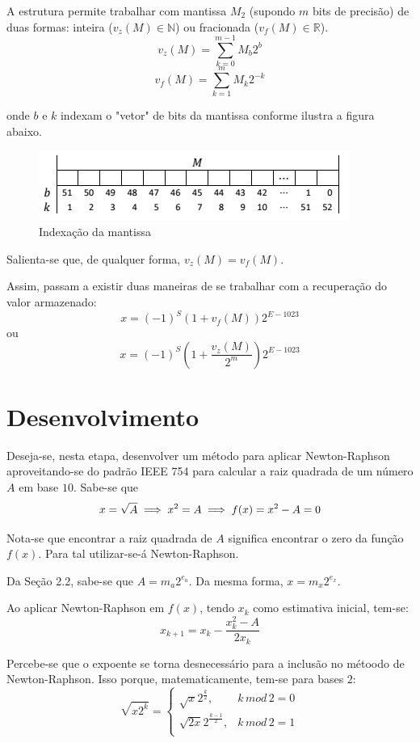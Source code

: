 	A estrutura permite trabalhar com mantissa $M_2$ (supondo $m$ bits de precisão) de duas formas: inteira ($v_z(M) \in \mathbb{N}$) ou fracionada ($v_f(M) \in \mathbb{R}$).
	$$v_z(M) = \sum_{k=0}^{m-1}{M_b2^{b}}$$
	$$v_f(M) = \sum_{k=1}^{m}{M_k2^{-k}}$$

	onde $b$ e $k$ indexam o "vetor" de bits da mantissa conforme ilustra a figura abaixo.
	\begin{figure}[h]
		\centering
		\includegraphics{index_mant}
		\caption{Indexação da mantissa}
		\label{fig:index_mant}
	\end{figure}

	Salienta-se que, de qualquer forma, $v_z(M) = v_f(M)$.

	Assim, passam a existir duas maneiras de se trabalhar com a recuperação do valor armazenado:
	$$x = (-1)^{S}(1 + v_f(M))2^{E - 1023}$$
	ou
	$$x = (-1)^{S}(1 + \frac{v_z(M)}{2^m})2^{E - 1023}$$

	\section{Desenvolvimento}
	\label{sec:desenvolvimento}

	Deseja-se, nesta etapa, desenvolver um método para aplicar Newton-Raphson aproveitando-se do padrão IEEE 754 para calcular a raiz quadrada de um número $A$ em base $10$.
	Sabe-se que
	$$x = \sqrt{A} \implies x^2 = A\\\implies f(x) = x^2 - A = 0$$

	Nota-se que encontrar a raiz quadrada de $A$ significa encontrar o zero da função $f(x)$. Para tal utilizar-se-á Newton-Raphson.

	Da Seção 2.2, sabe-se que $A = m_a2^{e_a}$. Da mesma forma, $x = m_x2^{e_x}$.

	Ao aplicar Newton-Raphson em $f(x)$, tendo $x_k$ como estimativa inicial, tem-se:
	$$x_{k+1} = x_k - \frac{x_k^2 - A}{2x_k}$$

	Percebe-se que o expoente se torna desnecessário para a inclusão no métoodo de Newton-Raphson. Isso porque, matematicamente, tem-se para bases $2$:
	\[
	\sqrt{x2^k} =
	\left\{
	\begin{array}{ll}
      \sqrt{x}2^{\frac{k}{2}}, & k\,mod\,2 = 0 \\
			\sqrt{2x}2^{\frac{k-1}{2}}, & k\,mod\,2 = 1\\
	\end{array}
	\right.
	\]

